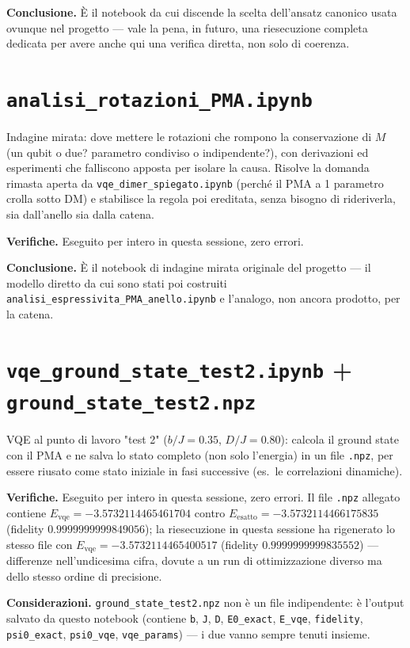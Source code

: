 \documentclass[11pt,a4paper]{article}
\begin{document}
\textbf{Conclusione.} È il notebook da cui discende la scelta dell'ansatz canonico
usata ovunque nel progetto — vale la pena, in futuro, una riesecuzione completa
dedicata per avere anche qui una verifica diretta, non solo di coerenza.

\section*{\texttt{analisi\_rotazioni\_PMA.ipynb}}

Indagine mirata: dove mettere le rotazioni che rompono la conservazione di $M$ (un
qubit o due? parametro condiviso o indipendente?), con derivazioni ed esperimenti
che falliscono apposta per isolare la causa. Risolve la domanda rimasta aperta da
\texttt{vqe\_dimer\_spiegato.ipynb} (perché il PMA a 1 parametro crolla sotto DM) e
stabilisce la regola poi ereditata, senza bisogno di rideriverla, sia
dall'anello sia dalla catena.

\textbf{Verifiche.} Eseguito per intero in questa sessione, zero errori.

\textbf{Conclusione.} È il notebook di indagine mirata originale del progetto — il
modello diretto da cui sono stati poi costruiti
\texttt{analisi\_espressivita\_PMA\_anello.ipynb} e l'analogo, non ancora prodotto,
per la catena.

\section*{\texttt{vqe\_ground\_state\_test2.ipynb} + \texttt{ground\_state\_test2.npz}}

VQE al punto di lavoro "test 2" ($b/J=0.35$, $D/J=0.80$): calcola il ground state
con il PMA e ne salva lo stato completo (non solo l'energia) in un file
\texttt{.npz}, per essere riusato come stato iniziale in fasi successive (es.\ le
correlazioni dinamiche).

\textbf{Verifiche.} Eseguito per intero in questa sessione, zero errori. Il file
\texttt{.npz} allegato contiene $E_\text{vqe}=-3.5732114465461704$ contro
$E_\text{esatto}=-3.5732114466175835$ (fidelity $0.9999999999849056$); la
riesecuzione in questa sessione ha rigenerato lo stesso file con
$E_\text{vqe}=-3.5732114465400517$ (fidelity $0.9999999999835552$) — differenze
nell'undicesima cifra, dovute a un run di ottimizzazione diverso ma dello stesso
ordine di precisione.

\textbf{Considerazioni.} \texttt{ground\_state\_test2.npz} non è un file
indipendente: è l'output salvato da questo notebook (contiene \texttt{b}, \texttt{J},
\texttt{D}, \texttt{E0\_exact}, \texttt{E\_vqe}, \texttt{fidelity},
\texttt{psi0\_exact}, \texttt{psi0\_vqe}, \texttt{vqe\_params}) — i due vanno
sempre tenuti insieme.
\end{document}
